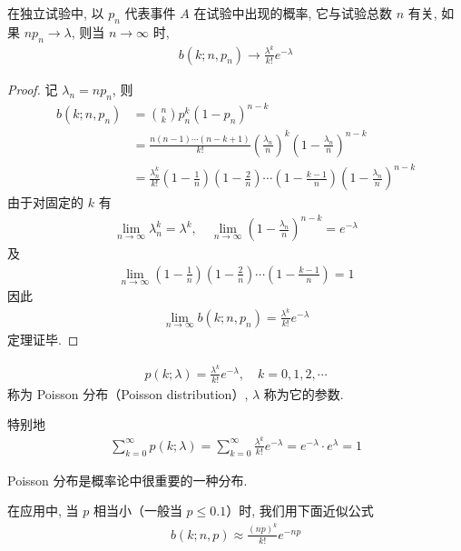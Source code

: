 \documentclass[../../main.tex]{subfiles}
\begin{document}
\begin{theorem}\label{theorem:ch02-Poisson逼近定理}
在独立试验中, 以 $p_n$ 代表事件 $A$ 在试验中出现的概率, 它与试验总数 $n$ 有关, 如果 $np_n\to\lambda$, 则当 $n\to\infty$ 时,
\begin{align*}
b(k;n,p_n)\to\frac{\lambda^k}{k!}e^{-\lambda}
\end{align*}

\begin{proof}
记 $\lambda_n=np_n$, 则
\begin{align*}
b(k;n,p_n)&=\binom{n}{k}p_n^k(1-p_n)^{n-k}\\
&=\frac{n(n-1)\cdots(n-k+1)}{k!}\left(\frac{\lambda_n}{n}\right)^k\left(1-\frac{\lambda_n}{n}\right)^{n-k}\\
&=\frac{\lambda_n^k}{k!}\left(1-\frac{1}{n}\right)\left(1-\frac{2}{n}\right)\cdots\left(1-\frac{k-1}{n}\right)\left(1-\frac{\lambda_n}{n}\right)^{n-k}
\end{align*}
由于对固定的 $k$ 有
\begin{align*}
\lim_{n\to\infty}\lambda_n^k=\lambda^k,\quad \lim_{n\to\infty}\left(1-\frac{\lambda_n}{n}\right)^{n-k}=e^{-\lambda}
\end{align*}
及
\begin{align*}
\lim_{n\to\infty}\left(1-\frac{1}{n}\right)\left(1-\frac{2}{n}\right)\cdots\left(1-\frac{k-1}{n}\right)=1
\end{align*}
因此
\begin{align*}
\lim_{n\to\infty} b(k;n,p_n)=\frac{\lambda^k}{k!}e^{-\lambda}
\end{align*}
定理证毕.
\end{proof}
\end{theorem}

\begin{align}\label{align:ch02-Poisson分布}
p(k;\lambda)=\frac{\lambda^k}{k!}e^{-\lambda},\quad k=0,1,2,\cdots
\end{align}
称为 Poisson 分布（Poisson distribution）, $\lambda$ 称为它的参数.

特别地
\begin{align}\label{align:ch02-Poisson分布归一化}
\sum_{k=0}^{\infty} p(k;\lambda)=\sum_{k=0}^{\infty}\frac{\lambda^k}{k!}e^{-\lambda}=e^{-\lambda}\cdot e^\lambda=1
\end{align}

Poisson 分布是概率论中很重要的一种分布.

在应用中, 当 $p$ 相当小（一般当 $p\leqslant 0.1$）时, 我们用下面近似公式
\begin{align}\label{align:ch02-Poisson近似公式}
b(k;n,p)\approx\frac{(np)^k}{k!}e^{-np}
\end{align}
\end{document}
